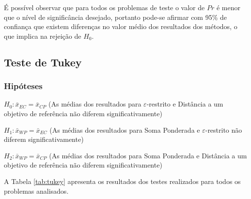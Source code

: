 É possível observar que para todos os problemas de teste o valor de $ Pr $ é menor que o nível de significância desejado, portanto pode-se afirmar com 95\% de confiança que existem diferenças no valor médio dos resultados dos métodos, o que implica na rejeição de $ H_0 $.

\subsection{Teste de Tukey}

\subsubsection*{Hipóteses}

$ H_0: \bar{x}_{EC} = \bar{x}_{CP} $ (As médias dos resultados para $ \varepsilon $-restrito e  Distância a um objetivo de referência não diferem significativamente)

$ H_1: \bar{x}_{WP} = \bar{x}_{EC} $ (As médias dos resultados para Soma Ponderada e $ \varepsilon $-restrito não diferem significativamente)

$ H_2: \bar{x}_{WP} = \bar{x}_{CP} $ (As médias dos resultados para Soma Ponderada e Distância a um objetivo de referência não diferem significativamente)


A Tabela \ref{tab:tukey} apresenta os resultados dos testes realizados para todos os problemas analisados. 

